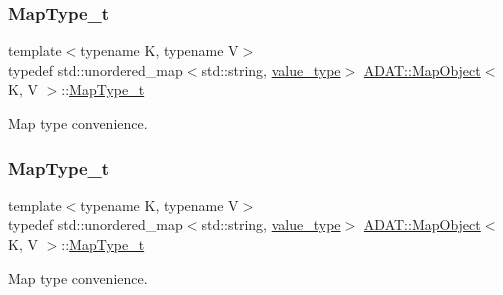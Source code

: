 \mbox{\label{classADAT_1_1MapObject_ad6a4952087d3de5a43d08b2ea2ad270b}} 
\subsubsection{\texorpdfstring{MapType\_t}{MapType\_t}\hspace{0.1cm}{\footnotesize\ttfamily [1/3]}}
{\footnotesize\ttfamily template$<$typename K, typename V$>$ \\
typedef std\+::unordered\+\_\+map$<$std\+::string, \mbox{\hyperlink{classADAT_1_1MapObject_ad985e6ff5b35a72c79d4b466d316cc0a}{value\+\_\+type}}$>$ \mbox{\hyperlink{classADAT_1_1MapObject}{A\+D\+A\+T\+::\+Map\+Object}}$<$ K, V $>$\+::\mbox{\hyperlink{classADAT_1_1MapObject_ad6a4952087d3de5a43d08b2ea2ad270b}{Map\+Type\+\_\+t}}}



Map type convenience. 

\mbox{\label{classADAT_1_1MapObject_ad6a4952087d3de5a43d08b2ea2ad270b}} 
\subsubsection{\texorpdfstring{MapType\_t}{MapType\_t}\hspace{0.1cm}{\footnotesize\ttfamily [2/3]}}
{\footnotesize\ttfamily template$<$typename K, typename V$>$ \\
typedef std\+::unordered\+\_\+map$<$std\+::string, \mbox{\hyperlink{classADAT_1_1MapObject_ad985e6ff5b35a72c79d4b466d316cc0a}{value\+\_\+type}}$>$ \mbox{\hyperlink{classADAT_1_1MapObject}{A\+D\+A\+T\+::\+Map\+Object}}$<$ K, V $>$\+::\mbox{\hyperlink{classADAT_1_1MapObject_ad6a4952087d3de5a43d08b2ea2ad270b}{Map\+Type\+\_\+t}}}



Map type convenience. 

\mbox{\label{classADAT_1_1MapObject_ad6a4952087d3de5a43d08b2ea2ad270b}} 

